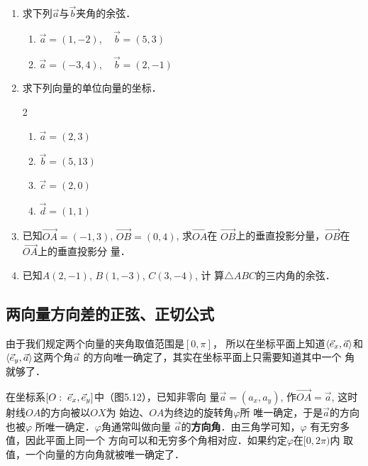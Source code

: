 \begin{ex}
\begin{enumerate}
    \item 求下列$\vec{a}$与$\vec{b}$夹角的余弦．
\begin{enumerate}
    \item $\vec{a}=(1,-2),\quad \vec{b}=(5,3)$
    \item $\vec{a}=(-3,4),\quad \vec{b}=(2,-1)$
\end{enumerate}  
    \item 求下列向量的单位向量的坐标．
\begin{multicols}{2}
\begin{enumerate}
    \item $\vec{a}=(2,3)$
    \item $\vec{b}=(5,13)$
    \item $\vec{c}=(2,0)$
    \item $\vec{d}=(1,1)$
\end{enumerate}
\end{multicols}
    \item 已知$\Vec{OA}=(-1,3)$, 
    $\Vec{OB}=(0,4)$, 求$\Vec{OA}$在
    $\Vec{OB}$上的垂直投影分量，$\Vec{OB}$在$\Vec{OA}$上的垂直投影分
    量．
    \item 已知$A(2,-1)$, $B(1,-3)$, $C(3,-4)$, 计
    算$\triangle ABC$的三内角的余弦．
\end{enumerate} 
\end{ex}

\subsection{两向量方向差的正弦、正切公式}
由于我们规定两个向量的夹角取值范围是$[0,\pi]$，
所以在坐标平面上知道$\left\langle \vec{e}_x,\vec{a} \right\rangle$和$\left\langle \vec{e}_y,\vec{a} \right\rangle$这两个角$\vec{a}$
的方向唯一确定了，其实在坐标平面上只需要知道其中一个
角就够了．

在坐标系$[O:\; \vec{e}_x,\vec{e}_y]$中（图5.12），已知非零向
量$\vec{a}=(a_x,a_y)$, 作$\Vec{OA}=\vec{a}$, 
这时射线$OA$的方向被以$OX$为
始边、$OA$为终边的旋转角$\varphi$所
唯一确定，于是$\vec{a}$的方向也被$\varphi$
所唯一确定．$\varphi$角通常叫做向量
$\vec{a}$的\textbf{方向角}．由三角学可知，$\varphi$
有无穷多值，因此平面上同一个
方向可以和无穷多个角相对应．如果约定$\varphi$在$[0,2\pi)$内
取值，一个向量的方向角就被唯一确定了．

\begin{figure}[htp]
    \centering
    \caption{}
\end{figure}

